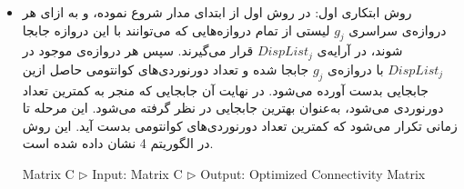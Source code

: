 \begin{itemize}
\item
روش ابتکاری اول:
در روش اول از ابتدای مدار شروع نموده، و به ازای هر دروازه‌ی سراسری $g_j$ لیستی از تمام دروازه‌هایی که می‌توانند با این دروازه جابجا شوند، در آرایه‌ی $DispList_j$ قرار می‌گیرند. سپس هر دروازه‌ی موجود در $DispList_j$ با دروازه‌ی $g_j$ جابجا شده و تعداد دورنوردی‌های کوانتومی حاصل ازین جابجایی بدست آورده می‌شود. در نهایت آن جابجایی که منجر به کمترین تعداد دورنوردی می‌شود، به‌عنوان بهترین جابجایی در نظر گرفته می‌شود. این مرحله تا زمانی تکرار می‌شود که کمترین تعداد دورنوردی‌های کوانتومی بدست آید. این روش  در الگوریتم 4 نشان داده شده است.


\begin{algorithm}[t]
{
\fontsize{9}{1}
\caption{$\text{: الگوریتم ابتکاری اول}$}
\begin{algorithmic}[4]
\begin{latin}
 { Matrix C}
\State\textcolor[rgb]{0.00,0.50,1.00}{ $\triangleright$ Input: Matrix C}
\State\textcolor[rgb]{0.00,0.50,1.00}{ $\triangleright$ Output: Optimized Connectivity Matrix}

       \EndIf
 \EndFor
\EndFor
{}
             \EndIf
 \EndFor
 \EndFor
\EndFunction
\end{latin}
\end{algorithmic}
}
\end{algorithm}



\end{itemize}
